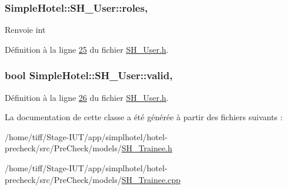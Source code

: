\hypertarget{classSimpleHotel_1_1SH__User_ad13699562fa07547a504d1310a9a942b}{
\subsubsection[{roles}]{\setlength{\rightskip}{0pt plus 5cm}Simple\-Hotel\-::\-S\-H\-\_\-\-User\-::roles\hspace{0.3cm}{\ttfamily [read]}, {\ttfamily [inherited]}}}\label{classSimpleHotel_1_1SH__User_ad13699562fa07547a504d1310a9a942b}
\begin{DoxyReturn}{Renvoie}
int 
\end{DoxyReturn}


Définition à la ligne \hyperlink{SH__User_8h_source_l00025}{25} du fichier \hyperlink{SH__User_8h_source}{S\-H\-\_\-\-User.\-h}.

\hypertarget{classSimpleHotel_1_1SH__User_ae1973ccbefacafb374919b5689109bf2}{
\subsubsection[{valid}]{\setlength{\rightskip}{0pt plus 5cm}bool Simple\-Hotel\-::\-S\-H\-\_\-\-User\-::valid\hspace{0.3cm}{\ttfamily [read]}, {\ttfamily [inherited]}}}\label{classSimpleHotel_1_1SH__User_ae1973ccbefacafb374919b5689109bf2}


Définition à la ligne \hyperlink{SH__User_8h_source_l00026}{26} du fichier \hyperlink{SH__User_8h_source}{S\-H\-\_\-\-User.\-h}.



La documentation de cette classe a été générée à partir des fichiers suivants \-:\begin{DoxyCompactItemize}
\item 
/home/tiff/\-Stage-\/\-I\-U\-T/app/simplhotel/hotel-\/precheck/src/\-Pre\-Check/models/\hyperlink{SH__Trainee_8h}{S\-H\-\_\-\-Trainee.\-h}\item 
/home/tiff/\-Stage-\/\-I\-U\-T/app/simplhotel/hotel-\/precheck/src/\-Pre\-Check/models/\hyperlink{SH__Trainee_8cpp}{S\-H\-\_\-\-Trainee.\-cpp}\end{DoxyCompactItemize}

